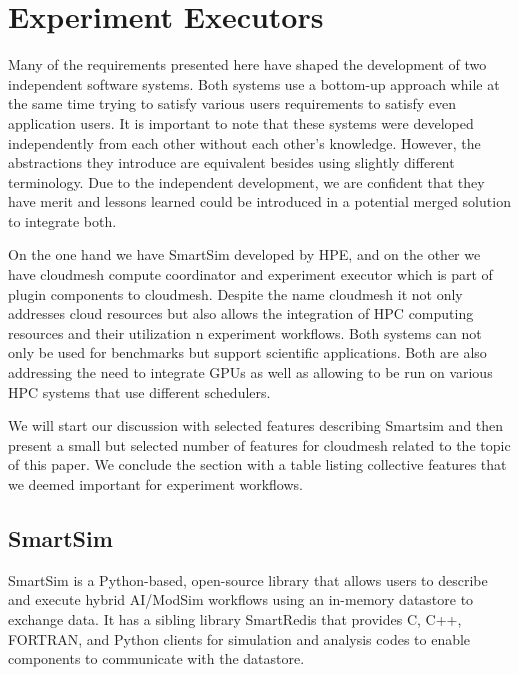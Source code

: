 \documentclass[utf8]{FrontiersinVancouver} %
\begin{document}
\section{Experiment Executors}

Many of the requirements presented here have shaped the development of two independent software systems. Both systems use a bottom-up approach while at the same time trying to satisfy various users requirements to satisfy even application users. 
It is important to note that these systems were developed independently from each other without each other's knowledge. However, the abstractions they introduce are equivalent besides using slightly different terminology. Due to the independent development, we are confident that they have merit and lessons learned could be introduced in a potential merged solution to integrate both.

On the one hand we have SmartSim developed by HPE, and on the other we have cloudmesh compute coordinator and experiment executor which is part of plugin components to cloudmesh. Despite the name cloudmesh it not only addresses cloud resources but also allows the integration of HPC computing resources and their utilization n experiment workflows. Both systems can not only be used for benchmarks but support scientific applications. Both are also addressing the need to integrate GPUs as well as allowing to be run on various HPC systems that use different schedulers. 

We will start our discussion with selected features describing Smartsim and then present a small but selected number of features for cloudmesh related to the topic of this paper. We conclude the section with a table listing collective features that we deemed important for experiment workflows.

\subsection{SmartSim}
\label{sec:smartsim}

SmartSim is a Python-based, open-source library that allows users to describe and execute hybrid AI/ModSim workflows using an in-memory datastore to exchange data. It has a sibling library SmartRedis that provides C, C++, FORTRAN, and  Python clients for simulation and analysis codes to enable components to communicate with the datastore.
\end{document}
